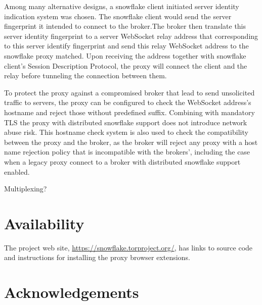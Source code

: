 \documentclass[letterpaper,twocolumn]{article}
\begin{document}
Among many alternative designs, a snowflake client initiated server identity indication system was chosen. The snowflake client would send the server fingerprint it intended to connect to the broker.The broker then translate this server identity fingerprint to a server WebSocket relay address that corresponding to this server identify fingerprint and send this relay WebSocket address to the snowflake proxy matched. Upon receiving the address together with snowflake client's Session Description Protocol, the proxy will connect the client and the relay before tunneling the connection between them.

To protect the proxy against a compromised broker that lead to send unsolicited traffic to servers, the proxy can be configured to check the WebSocket address's hostname and reject those without predefined suffix. Combining with mandatory TLS the proxy with distributed snowflake support does not introduce network abuse risk. This hostname check system is also used to check the compatibility between the proxy and the broker, as the broker will reject any proxy with a host name rejection policy that is incompatible with the brokers', including the case when a legacy proxy connect to a broker with distributed snowflake support enabled.

Multiplexing?

\section*{Availability}

The project web site,
\url{https://snowflake.torproject.org/},
has links to source code
and instructions for installing the proxy browser extensions.

\section*{Acknowledgements}
\end{document}
